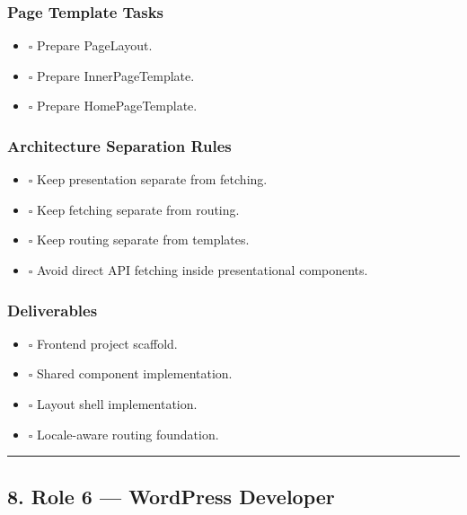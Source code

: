 \documentclass[12pt,a4paper]{article}
\providecommand{\tightlist}{\setlength{\itemsep}{0pt}\setlength{\parskip}{0pt}}
\begin{document}
\subsubsection{Page Template Tasks}\label{page-template-tasks}

\begin{itemize}
\tightlist
\item
  \(\square\) Prepare PageLayout.
\item
  \(\square\) Prepare InnerPageTemplate.
\item
  \(\square\) Prepare HomePageTemplate.
\end{itemize}

\subsubsection{Architecture Separation Rules}\label{architecture-separation-rules}

\begin{itemize}
\tightlist
\item
  \(\square\) Keep presentation separate from fetching.
\item
  \(\square\) Keep fetching separate from routing.
\item
  \(\square\) Keep routing separate from templates.
\item
  \(\square\) Avoid direct API fetching inside presentational components.
\end{itemize}

\subsubsection{Deliverables}\label{deliverables-3}

\begin{itemize}
\tightlist
\item
  \(\square\) Frontend project scaffold.
\item
  \(\square\) Shared component implementation.
\item
  \(\square\) Layout shell implementation.
\item
  \(\square\) Locale-aware routing foundation.
\end{itemize}

\begin{center}\rule{0.5\linewidth}{0.5pt}\end{center}

\subsection{8. Role 6 --- WordPress Developer}\label{role-6-wordpress-developer}
\end{document}
